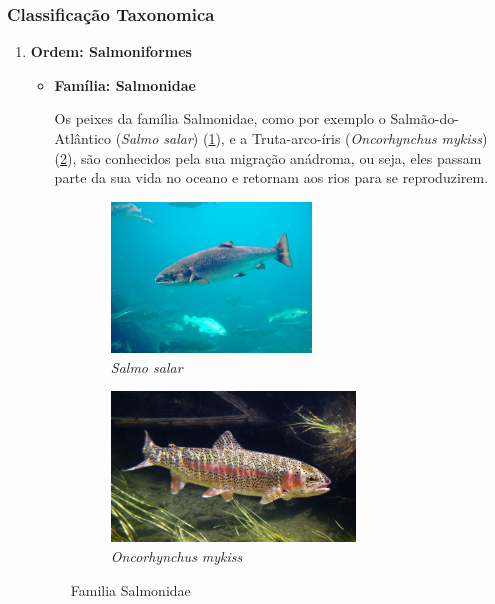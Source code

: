 \documentclass{report}
\begin{document}
\subsubsection{Classificação Taxonomica}
\begin{enumerate}
	\item \textbf{Ordem: Salmoniformes}
	\begin{itemize}
		\item \textbf{Família: Salmonidae}
		
Os peixes da família Salmonidae, como por exemplo o Salmão-do-Atlântico (\textit{Salmo salar}) (\ref{fig:salmao}), e a Truta-arco-íris (\textit{Oncorhynchus mykiss}) (\ref{fig:truta}), são conhecidos pela sua migração anádroma, ou seja, eles passam parte da sua vida no oceano e retornam aos rios para se reproduzirem.
	\end{itemize}
	
	\begin{figure}[H]
	\center
    		\begin{subfigure}{.5\textwidth}
    		\center
        		\includegraphics[height=4cm]{imagens/salmao.jpg}
        		\caption{\textit{Salmo salar}}
        		\label{fig:salmao}
    		\end{subfigure}%
   		\begin{subfigure}{.5\textwidth}
    		\center
        		\includegraphics[height=4cm]{imagens/truta.jpg}
        		\caption{\textit{Oncorhynchus mykiss}}
       	 	\label{fig:truta}
    		\end{subfigure}
    		\caption{Familia Salmonidae}
    		\label{fig:salmonidae}
	\end{figure}
	
	
	

\end{enumerate}
\end{document}
